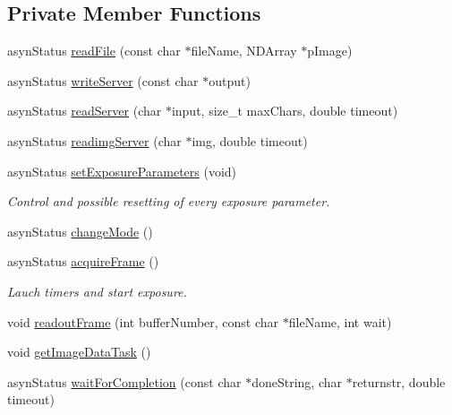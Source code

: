 \subsection*{\-Private \-Member \-Functions}
\begin{DoxyCompactItemize}
\item 
asyn\-Status \hyperlink{classxpad_a31376e2089c2a75853047a42414d905d}{read\-File} (const char $\ast$file\-Name, \-N\-D\-Array $\ast$p\-Image)
\item 
asyn\-Status \hyperlink{classxpad_ab6b499351a4059fe1b0b16d8ecbeb71f}{write\-Server} (const char $\ast$output)
\item 
asyn\-Status \hyperlink{classxpad_ad8c837fa324429acb3b514203e14b58b}{read\-Server} (char $\ast$input, size\-\_\-t max\-Chars, double timeout)
\item 
asyn\-Status \hyperlink{classxpad_a2c6894b37abc89be6830cc46f18277ed}{readimg\-Server} (char $\ast$img, double timeout)
\item 
asyn\-Status \hyperlink{classxpad_aee07cdb64b82b6f102e3ae2659226423}{set\-Exposure\-Parameters} (void)
\begin{DoxyCompactList}\small\item\em \-Control and possible resetting of every exposure parameter. \end{DoxyCompactList}\item 
asyn\-Status \hyperlink{classxpad_a9c6c269711e3cf514a5883856d1627df}{change\-Mode} ()
\item 
asyn\-Status \hyperlink{classxpad_af778260bbf7b67db0488952f7add28aa}{acquire\-Frame} ()
\begin{DoxyCompactList}\small\item\em \-Lauch timers and start exposure. \end{DoxyCompactList}\item 
void \hyperlink{classxpad_a825248151ba164810cf7b933c76c3abb}{readout\-Frame} (int buffer\-Number, const char $\ast$file\-Name, int wait)
\item 
void \hyperlink{classxpad_a2d4643b8f437d9c0b393e2b41cc8b950}{get\-Image\-Data\-Task} ()
\item 
asyn\-Status \hyperlink{classxpad_a20144d5d2fa1ad9e106baac2a168780c}{wait\-For\-Completion} (const char $\ast$done\-String, char $\ast$returnstr, double timeout)
\end{DoxyCompactItemize}
